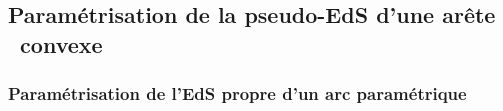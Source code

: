 \subsection{Paramétrisation de la pseudo-EdS d'une arête \brep\ convexe}%

\subsubsection{Paramétrisation de l'EdS propre d'un arc paramétrique}
\label{section:parametrisation_EdS_propre_courbe}




